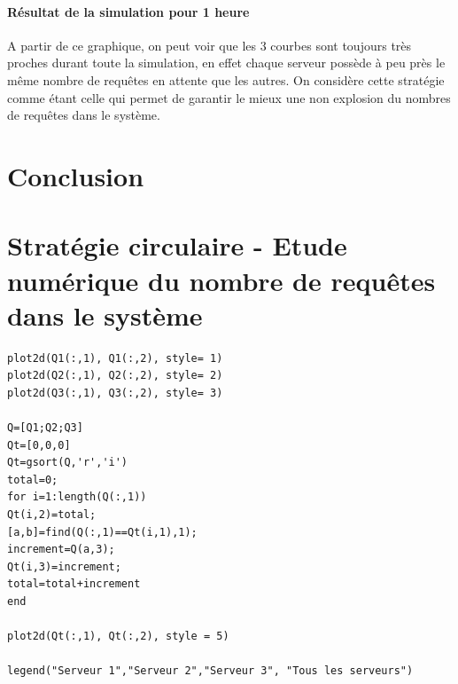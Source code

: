 \documentclass{article}
\begin{document}
\paragraph{Résultat de la simulation pour 1 heure} A partir de ce graphique, on peut voir que les 3 courbes sont toujours très proches durant toute la simulation, en effet chaque serveur possède à peu près le même nombre de requêtes en attente que les autres. On considère cette stratégie comme étant celle qui permet de garantir le mieux une non explosion du nombres de requêtes dans le système.

\section{Conclusion}
\paragraph{}

\newpage
\appendix

\section{Stratégie circulaire - Etude numérique du nombre de requêtes dans le système}\label{tls}
%
\begin{verbatim}
plot2d(Q1(:,1), Q1(:,2), style= 1)
plot2d(Q2(:,1), Q2(:,2), style= 2)
plot2d(Q3(:,1), Q3(:,2), style= 3)

Q=[Q1;Q2;Q3]
Qt=[0,0,0]
Qt=gsort(Q,'r','i')
total=0;
for i=1:length(Q(:,1))
Qt(i,2)=total;
[a,b]=find(Q(:,1)==Qt(i,1),1);
increment=Q(a,3);
Qt(i,3)=increment;
total=total+increment
end

plot2d(Qt(:,1), Qt(:,2), style = 5)

legend("Serveur 1","Serveur 2","Serveur 3", "Tous les serveurs")
\end{verbatim}
%
\end{document}
